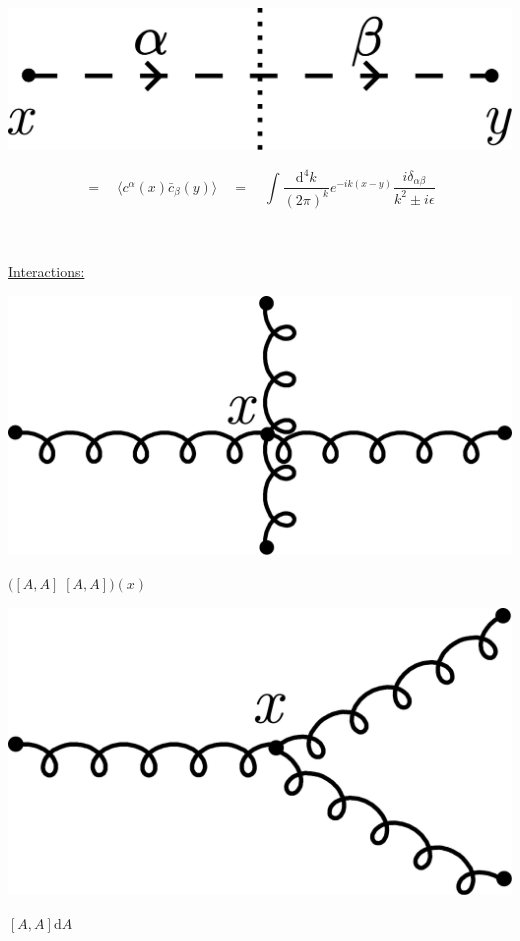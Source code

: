 \documentclass[a4paper,11pt]{article}
\renewcommand{\d}{{\mathrm{d}}}
\begin{document}
\begin{minipage}{.1\textwidth}
	\!\!\!\!\!\!\!\!\!\!\!\!\!\!\!\!\!\!\includegraphics[width=2\textwidth]{Drawings/Draw_3.pdf}
\end{minipage}
\begin{minipage}{.6\textwidth}
	$$= \quad \langle c^\alpha(x) \bar{c}_\beta (y)\rangle \quad = \quad \int \frac{\d^4k}{(2\pi)^k}e^{-ik(x-y)}\frac{i \delta_{\alpha\beta}}{k^2 \pm i\epsilon}$$
\end{minipage}\\ \\

\noindent\underline{Interactions:}\\

\begin{minipage}{.2\textwidth}
	\includegraphics[width=\textwidth]{Drawings/Draw_7.pdf}
\end{minipage}
\begin{minipage}{.3\textwidth}
	$\Big([A,A]\;[A,A]\Big)(x)$
\end{minipage}

\begin{minipage}{.2\textwidth}
	\includegraphics[width=\textwidth]{Drawings/Draw_8.pdf}
\end{minipage}
\begin{minipage}{.3\textwidth}
	$[A,A] \d A$
\end{minipage}
\end{document}
